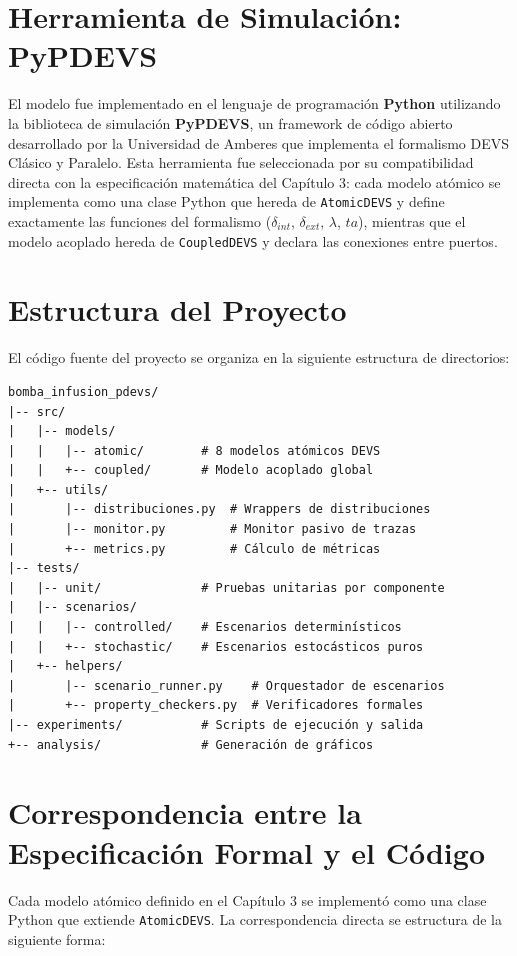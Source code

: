 \section{Herramienta de Simulación: PyPDEVS}

El modelo fue implementado en el lenguaje de programación \textbf{Python} utilizando la biblioteca de simulación \textbf{PyPDEVS}, un framework de código abierto desarrollado por la Universidad de Amberes que implementa el formalismo DEVS Clásico y Paralelo. Esta herramienta fue seleccionada por su compatibilidad directa con la especificación matemática del Capítulo 3: cada modelo atómico se implementa como una clase Python que hereda de \texttt{AtomicDEVS} y define exactamente las funciones del formalismo ($\delta_{int}$, $\delta_{ext}$, $\lambda$, $ta$), mientras que el modelo acoplado hereda de \texttt{CoupledDEVS} y declara las conexiones entre puertos.

\section{Estructura del Proyecto}

El código fuente del proyecto se organiza en la siguiente estructura de directorios:

\begin{verbatim}
bomba_infusion_pdevs/
|-- src/
|   |-- models/
|   |   |-- atomic/        # 8 modelos atómicos DEVS
|   |   +-- coupled/       # Modelo acoplado global
|   +-- utils/
|       |-- distribuciones.py  # Wrappers de distribuciones
|       |-- monitor.py         # Monitor pasivo de trazas
|       +-- metrics.py         # Cálculo de métricas
|-- tests/
|   |-- unit/              # Pruebas unitarias por componente
|   |-- scenarios/
|   |   |-- controlled/    # Escenarios determinísticos
|   |   +-- stochastic/    # Escenarios estocásticos puros
|   +-- helpers/
|       |-- scenario_runner.py    # Orquestador de escenarios
|       +-- property_checkers.py  # Verificadores formales
|-- experiments/           # Scripts de ejecución y salida
+-- analysis/              # Generación de gráficos
\end{verbatim}

\section{Correspondencia entre la Especificación Formal y el Código}

Cada modelo atómico definido en el Capítulo 3 se implementó como una clase Python que extiende \texttt{AtomicDEVS}. La correspondencia directa se estructura de la siguiente forma:


